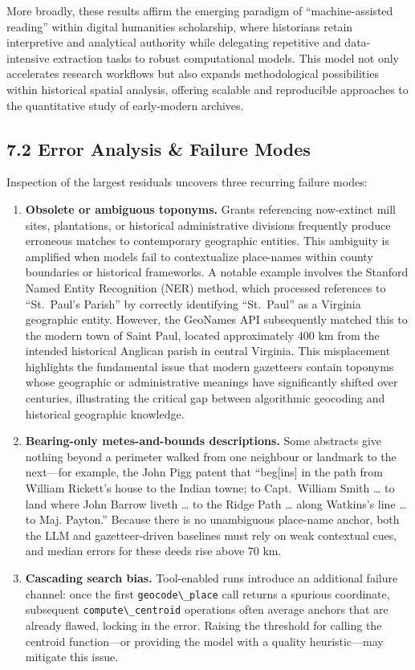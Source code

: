 \documentclass[
  10pt,
  twocolumn]{article}
\begin{document}
More broadly, these results affirm the emerging paradigm of
``machine-assisted reading'' within digital humanities scholarship,
where historians retain interpretive and analytical authority while
delegating repetitive and data-intensive extraction tasks to robust
computational models. This model not only accelerates research workflows
but also expands methodological possibilities within historical spatial
analysis, offering scalable and reproducible approaches to the
quantitative study of early-modern archives.

\subsection{7.2 Error Analysis \& Failure
Modes}\label{error-analysis-failure-modes}

Inspection of the largest residuals uncovers three recurring failure
modes:

\begin{enumerate}
\def\labelenumi{\arabic{enumi}.}
\item
  \textbf{Obsolete or ambiguous toponyms.} Grants referencing
  now-extinct mill sites, plantations, or historical administrative
  divisions frequently produce erroneous matches to contemporary
  geographic entities. This ambiguity is amplified when models fail to
  contextualize place-names within county boundaries or historical
  frameworks. A notable example involves the Stanford Named Entity
  Recognition (NER) method, which processed references to ``St.~Paul's
  Parish'' by correctly identifying ``St.~Paul'' as a Virginia
  geographic entity. However, the GeoNames API subsequently matched this
  to the modern town of Saint Paul, located approximately 400 km from
  the intended historical Anglican parish in central Virginia. This
  misplacement highlights the fundamental issue that modern gazetteers
  contain toponyms whose geographic or administrative meanings have
  significantly shifted over centuries, illustrating the critical gap
  between algorithmic geocoding and historical geographic knowledge.
\item
  \textbf{Bearing-only metes-and-bounds descriptions.} Some abstracts
  give nothing beyond a perimeter walked from one neighbour or landmark
  to the next---for example, the John Pigg patent that ``beg{[}ins{]} in
  the path from William Rickett's house to the Indian towne; to
  Capt.~William Smith \ldots{} to land where John Barrow liveth \ldots{}
  to the Ridge Path \ldots{} along Watkins's line \ldots{} to Maj.
  Payton.'' Because there is no unambiguous place-name anchor, both the
  LLM and gazetteer-driven baselines must rely on weak contextual cues,
  and median errors for these deeds rise above 70 km.
\item
  \textbf{Cascading search bias.} Tool-enabled runs introduce an
  additional failure channel: once the first
  \passthrough{\lstinline!geocode\_place!} call returns a spurious
  coordinate, subsequent \passthrough{\lstinline!compute\_centroid!}
  operations often average anchors that are already flawed, locking in
  the error. Raising the threshold for calling the centroid
  function---or providing the model with a quality heuristic---may
  mitigate this issue.
\end{enumerate}
\end{document}

